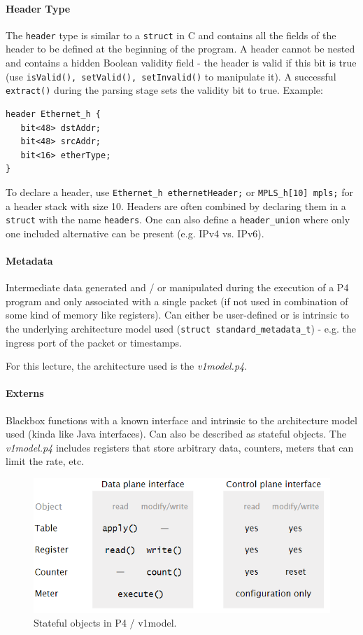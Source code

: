\paragraph{Header Type}
The \texttt{header} type is similar to a \texttt{struct} in C and contains all the fields of the header to be defined at the beginning of the program. A header cannot be nested and contains a hidden Boolean validity field - the header is valid if this bit is true (use \texttt{isValid(), setValid(), setInvalid()} to manipulate it). A successful \texttt{extract()} during the parsing stage sets the validity bit to true. Example:

\begin{lstlisting}
header Ethernet_h {
   bit<48> dstAddr;
   bit<48> srcAddr;
   bit<16> etherType;
}
\end{lstlisting}

To declare a header, use \texttt{Ethernet\_h ethernetHeader;} or \texttt{MPLS\_h[10] mpls;} for a header stack with size 10. Headers are often combined by declaring them in a \texttt{struct} with the name \texttt{headers}. One can also define a \texttt{header\_union} where only one included alternative can be present (e.g. IPv4 vs. IPv6).

\paragraph{Metadata}
Intermediate data generated and / or manipulated during the execution of a P4 program and only associated with a single packet (if not used in combination of some kind of memory like registers). Can either be user-defined or is intrinsic to the underlying architecture model used (\texttt{struct standard\_metadata\_t}) - e.g. the ingress port of the packet or timestamps. %

For this lecture, the architecture used is the \textit{v1model.p4}.

\paragraph{Externs}
Blackbox functions with a known interface and intrinsic to the architecture model used (kinda like Java interfaces). Can also be described as stateful objects. The \textit{v1model.p4} includes registers that store arbitrary data, counters, meters that can limit the rate, etc.

\begin{figure}[h]
	\centering
	\includegraphics[scale=0.6]{images/6-externs.PNG}
	\caption{Stateful objects in P4 / v1model.}
	\label{fig:externs}
\end{figure}

